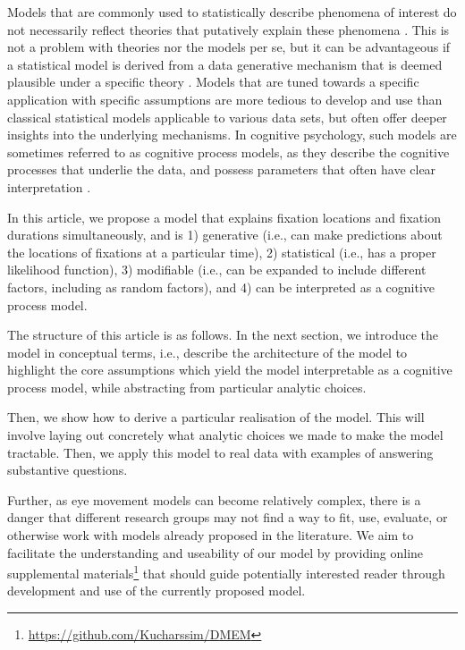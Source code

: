 \documentclass{article}
\begin{document}
Models that are commonly used to statistically describe phenomena of interest do not necessarily reflect theories that putatively explain these phenomena \citep[for an example, see][]{tatler2017latest}. This is not a problem with theories nor the models per se, but it can be advantageous if a statistical model is derived from a data generative mechanism that is deemed plausible under a specific theory \citep{borsboom2020theory}. Models that are tuned towards a specific application with specific assumptions are more tedious to develop and use than classical statistical models applicable to various data sets, but often offer deeper insights into the underlying mechanisms. In cognitive psychology, such models are sometimes referred to as cognitive process models, as they describe the cognitive processes that underlie the data, and possess parameters that often have clear interpretation \citep{forstmann2015introduction}.

In this article, we propose a model that explains fixation locations and fixation durations simultaneously, and is 1) generative (i.e., can make predictions about the locations of fixations at a particular time), 2) statistical (i.e., has a proper likelihood function), 3) modifiable (i.e., can be expanded to include different factors, including as random factors), and 4) can be interpreted as a cognitive process model. 

The structure of this article is as follows. In the next section, we introduce the model in conceptual terms, i.e., describe the architecture of the model to highlight the core assumptions which yield the model interpretable as a cognitive process model, while abstracting from particular analytic choices. 

Then, we show how to derive a particular realisation of the model. This will involve laying out concretely what analytic choices we made to make the model tractable. Then, we apply this model to real data with examples of answering substantive questions.

Further, as eye movement models can become relatively complex, there is a danger that different research groups may not find a way to fit, use, evaluate, or otherwise work with models already proposed in the literature. We aim to facilitate the understanding and useability of our model by providing online supplemental materials\footnote{\url{https://github.com/Kucharssim/DMEM}} that should guide potentially interested reader through development and use of the currently proposed model.
\end{document}
